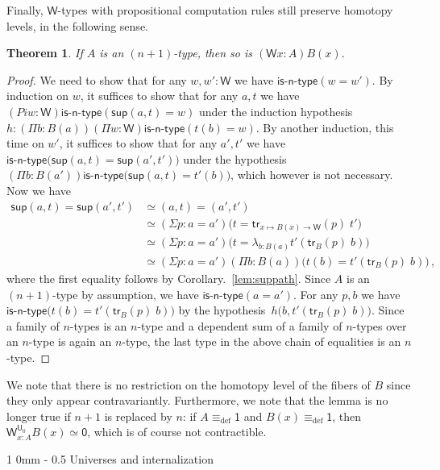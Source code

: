 \documentclass[10pt,a4paper,oneside,reqno]{amsart}
\makeatletter
\numberwithin{equation}{section}
\renewcommand{\section}{\@startsection
  {section}%
   {1}%
  {0mm}%
   {-\baselineskip}%
  {0.5\baselineskip}%
   {\Large\bfseries}}%
\theoremstyle{mythm}
\newtheorem{theorem}{Theorem}[section]
\theoremstyle{mydef}
\theoremstyle{myrmk}
\newcommand{\deq}{\equiv}
\newcommand{\defeq}{\deq_{\mathrm{def}}}
\newcommand{\isntype}[1]{\mathsf{is}\text{-}\mathsf{#1}\text{-}\mathsf{type}}
\newcommand{\trans}{\mathsf{tr}}
\newcommand{\lam}[1]{\lambda_{#1}}
\newcommand{\W}{\mathsf{W}}
\newcommand{\wsup}{\mathsf{sup}}
\newcommand{\one}{\mathsf{1}}
\newcommand{\zero}{\mathsf{0}}
\newcommand{\UU}{\mathsf{U}}
\makeatother
\begin{document}
Finally, $\W$-types with propositional computation rules still preserve homotopy levels, in the following sense.

\begin{theorem}
If $A$ is an $(n+1)$-type, then so is $(\W x:A)B(x)$.
\end{theorem}


\begin{proof}
We need to show that for any $w, w' : \W$ we have $\isntype{n}(w = w')$. By induction on $w$, it suffices to show that for any $a,t$ we have $(Pi w:\W) \isntype{n}(\wsup(a,t) = w)$ under the induction hypothesis $h : (\Pi b:B(a)) (\Pi w:\W) \isntype{n}(t(b) = w)$.  By another induction, this time on $w'$, it suffices to show that for any $a',t'$ we have
$\isntype{n}\big(\wsup(a,t) = \wsup(a',t')\big)$ under the hypothesis $(\Pi b:B(a')) \isntype{n}\big(\wsup(a,t) = t'(b)\big)$, which however is not necessary. Now we have
\begin{align*} 
\wsup(a,t) = \wsup(a',t') 
& \simeq (a,t) = (a',t') \\
& \simeq (\Sigma p : a = a') \big(t = \trans_{x \mapsto B(x) \to \W}(p) \; t'\big) \\
& \simeq  (\Sigma p : a = a')  \big(t = \lam{b:B(a)} t'(\trans_B(p) \; b)\big) \\
& \simeq (\Sigma p : a = a') (\Pi b:B(a)) \big(t(b) = t'(\trans_B(p) \; b)\big) \, , 
\end{align*}
where the first equality follows by Corollary.~\ref{lem:suppath}. Since $A$ is an $(n+1)$-type by assumption, we have $\isntype{n}(a=a')$. For any $p,b$ we have $\isntype{n}\big(t(b) = t'(\trans_B(p) \; b)\big)$ by the hypothesis~$h\big(b,t'(\trans_B(p) \; b)\big)$. Since a family of $n$-types is an $n$-type and a dependent sum of a family of $n$-types over an $n$-type is again an $n$-type, the last type in the above chain of equalities is an $n$-type. 
\end{proof}

We note that there is no restriction on the homotopy level of the fibers of $B$ since they only appear contravariantly. Furthermore, we note that the lemma is no longer true if $n+1$ is replaced by $n$: if $A \defeq \one$ and $B(x) \defeq \one$, then $\W^{\UU_0}_{x:A} B(x) \simeq \zero$, which is of course not contractible. 

\section{Universes and internalization}
\end{document}
